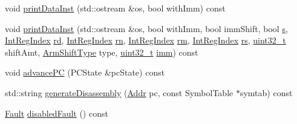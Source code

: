 \begin{DoxyCompactItemize}
\item 
void \hyperlink{classArmISA_1_1ArmStaticInst_a4acc01aec616addcddc2958cff18ec04}{printDataInst} (std::ostream \&os, bool withImm) const 
\item 
void \hyperlink{classArmISA_1_1ArmStaticInst_a8ffe4c63f924a39c3916afb0cb24aad0}{printDataInst} (std::ostream \&os, bool withImm, bool immShift, bool \hyperlink{namespaceArmISA_afaeb18e17f862d8fcb76dfb68a18854f}{s}, \hyperlink{namespaceArmISA_ae64680ba9fb526106829d6bf92fc791b}{IntRegIndex} \hyperlink{namespaceArmISA_a7108a0a03f819a683bb745ab6e02179d}{rd}, \hyperlink{namespaceArmISA_ae64680ba9fb526106829d6bf92fc791b}{IntRegIndex} \hyperlink{namespaceArmISA_adf8c6c579ad8729095a637a4f2181211}{rn}, \hyperlink{namespaceArmISA_ae64680ba9fb526106829d6bf92fc791b}{IntRegIndex} \hyperlink{namespaceArmISA_ad546c2cf2168cf2d8ac21b2a9f485e82}{rm}, \hyperlink{namespaceArmISA_ae64680ba9fb526106829d6bf92fc791b}{IntRegIndex} \hyperlink{namespaceArmISA_acf2b1073855b77fc0cddb61c70ec5391}{rs}, \hyperlink{Type_8hh_a435d1572bf3f880d55459d9805097f62}{uint32\_\-t} shiftAmt, \hyperlink{namespaceArmISA_a209d79feaaef0aa2f54ae62e53ee90de}{ArmShiftType} type, \hyperlink{Type_8hh_a435d1572bf3f880d55459d9805097f62}{uint32\_\-t} \hyperlink{namespaceArmISA_a2308526fcc9af84548a72f9ba3102ec1}{imm}) const 
\item 
void \hyperlink{classArmISA_1_1ArmStaticInst_af04cd01429462d48e635f3e01ced6257}{advancePC} (PCState \&pcState) const 
\item 
std::string \hyperlink{classArmISA_1_1ArmStaticInst_a95d323a22a5f07e14d6b4c9385a91896}{generateDisassembly} (\hyperlink{classm5_1_1params_1_1Addr}{Addr} pc, const SymbolTable $\ast$symtab) const 
\item 
\hyperlink{classRefCountingPtr}{Fault} \hyperlink{classArmISA_1_1ArmStaticInst_a620f503b160038dbe4b15bada1adb0c9}{disabledFault} () const 
\end{DoxyCompactItemize}
